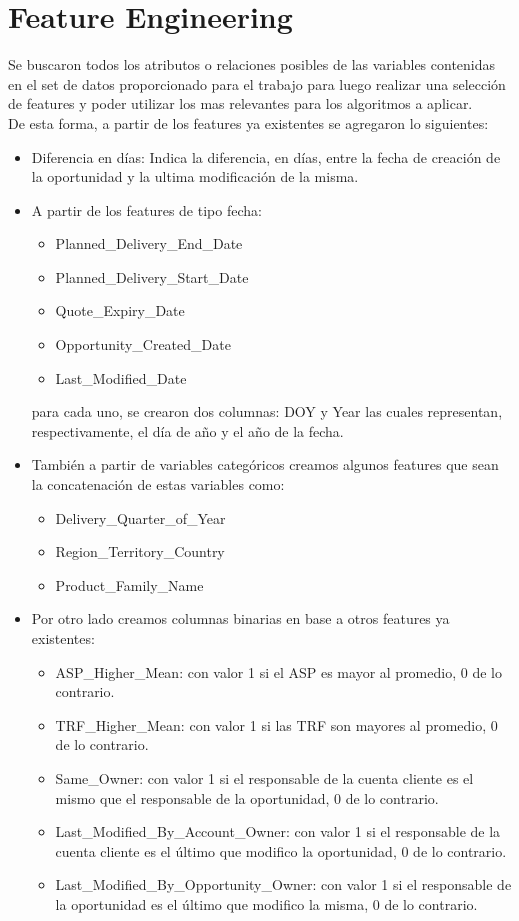 \documentclass[12pt,a4paper]{article}
\begin{document}
\section{Feature Engineering}
Se buscaron todos los atributos o relaciones posibles de las variables contenidas en el set de
datos proporcionado para el trabajo para luego realizar una selección de features y poder utilizar los mas relevantes para los algoritmos a aplicar.\\
De esta forma, a partir de los features ya existentes se agregaron lo siguientes:
\begin{itemize}
    \item Diferencia en días: Indica la diferencia, en días, entre la fecha de creación de la oportunidad y la ultima modificación de la misma.
    \item A partir de los features de tipo fecha:
    \begin{itemize}
        \item Planned\_Delivery\_End\_Date
        \item Planned\_Delivery\_Start\_Date
        \item Quote\_Expiry\_Date
        \item Opportunity\_Created\_Date
        \item Last\_Modified\_Date
    \end{itemize}
    para cada uno, se crearon dos columnas: DOY y Year las cuales representan, respectivamente, el día de año y el año de la fecha.
    \item También a partir de variables categóricos creamos algunos features que sean la concatenación de estas variables como:
    \begin{itemize}
        \item Delivery\_Quarter\_of\_Year
        \item Region\_Territory\_Country
        \item Product\_Family\_Name
    \end{itemize}
    \item Por otro lado creamos columnas binarias en base a otros features ya existentes:
    \begin{itemize}
        \item ASP\_Higher\_Mean: con valor 1 si el ASP es mayor al promedio, 0 de lo contrario.
        \item TRF\_Higher\_Mean: con valor 1 si las TRF son mayores al promedio, 0 de lo contrario.
        \item Same\_Owner: con valor 1 si el responsable de la cuenta cliente es el mismo que el responsable de la oportunidad, 0 de lo contrario. 
        \item Last\_Modified\_By\_Account\_Owner: con valor 1 si el responsable de la cuenta cliente es el último que modifico la  oportunidad, 0 de lo contrario.
        \item Last\_Modified\_By\_Opportunity\_Owner: con valor 1 si el responsable de la oportunidad  es el último que modifico la  misma, 0 de lo contrario.
    \end{itemize}
\end{itemize}
\end{document}
